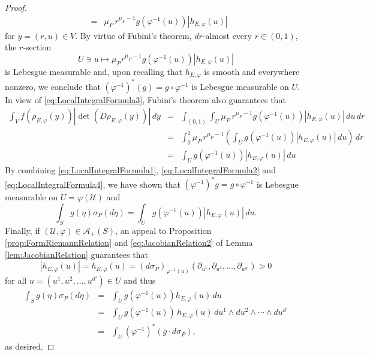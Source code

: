 \documentclass[11pt]{article}
\theoremstyle{remark}
\renewcommand\det{\operatorname{det}}
\begin{document}
\begin{proof}
\begin{eqnarray}
    &=& \mu_P\,r^{\mu_P-1}g(\varphi^{-1}(u))|h_{E,\varphi}(u)|
\end{eqnarray}
for $y=(r,u)\in V$. By virtue of Fubini's theorem, $dr$-almost every $r\in (0,1)$, the $r$-section 
\begin{equation*}
    U\ni u\mapsto \mu_P r^{\mu_P-1}g(\varphi^{-1}(u))|h_{E,\varphi}(u)|
\end{equation*}
is Lebesgue measurable and,  upon recalling that $h_{E,\varphi}$ is smooth and everywhere nonzero, we conclude that $(\varphi^{-1})^*(g)=g\circ\varphi^{-1}$ is Lebesgue measurable on $U$. In view of \eqref{eq:LocalIntegralFormula3}, Fubini's theorem also guarantees that
\begin{eqnarray}\label{eq:LocalIntegralFormula4}\nonumber
    \int_V f(\rho_{E,\varphi}(y))|\det(D\rho_{E,\varphi}(y))|\,dy
    &=&\int_{(0,1)}\int_U \mu_P\, r^{\mu_P-1}g(\varphi^{-1}(u))|h_{E,\varphi}(u)|\,du\,dr\\\nonumber
    &=&\int_0^1\mu_P\, r^{\mu_P-1}\left(\int_U g(\varphi^{-1}(u))|h_{E,\varphi}(u)|\,du\right)\,dr\\
    &=&\int_U g(\varphi^{-1}(u))|h_{E,\varphi}(u)|\,du
\end{eqnarray}
By combining \eqref{eq:LocalIntegralFormula1}, \eqref{eq:LocalIntegralFormula2} and \eqref{eq:LocalIntegralFormula4}, we have shown that $(\varphi^{-1})^*g=g\circ\varphi^{-1}$ is Lebesgue measurable on $U=\varphi(\mathcal{U})$ and
\begin{equation*}
    \int_S g(\eta)\sigma_P(d\eta)=\int_U g(\varphi^{-1}(u))|h_{E,\varphi}(u)|\,du.
\end{equation*}
Finally, if $(\mathcal{U},\varphi)\in\mathcal{A}_+(S)$, an appeal to Proposition \ref{prop:FormRiemannRelation} and \eqref{eq:JacobianRelation2} of Lemma \ref{lem:JacobianRelation} guarantees that
\begin{equation*}
    |h_{E,\varphi}(u)|=h_{E,\varphi}(u)=(d\sigma_P)_{\varphi^{-1}(u)}(\partial_{u^1},\partial_{u^2},\dots,\partial_{u^{d'}})>0
\end{equation*}
for all $u=(u^1,u^2,\dots,u^{d'})\in U$ and thus
\begin{eqnarray*}
        \int_S g(\eta)\sigma_P(d\eta)&=&\int_U g(\varphi^{-1}(u))h_{E,\varphi}(u)\,du\\
        &=&\int_U g(\varphi^{-1}(u))\,h_{E,\varphi}(u)\,du^1\wedge du^2\wedge\cdots \wedge du^{d'}\\
        &=&\int_U (\varphi^{-1})^*(g\cdot d\sigma_P),
\end{eqnarray*}
as desired. 
\end{proof}
\end{document}
